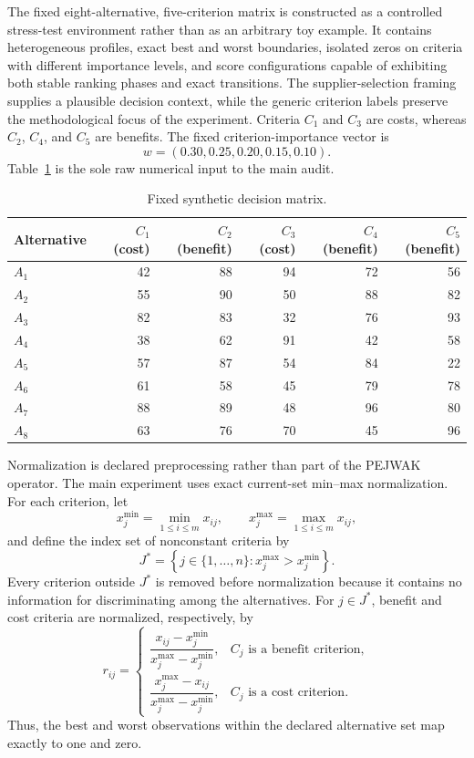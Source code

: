 \documentclass[reqno,11pt]{amsart}
\theoremstyle{definition}
\theoremstyle{plain}
\theoremstyle{remark}
\begin{document}
The fixed eight-alternative, five-criterion matrix is constructed as a
controlled stress-test environment rather than as an arbitrary toy
example. It contains heterogeneous profiles, exact best and worst
boundaries, isolated zeros on criteria with different importance levels,
and score configurations capable of exhibiting both stable ranking
phases and exact transitions. The supplier-selection framing supplies a
plausible decision context, while the generic criterion labels preserve
the methodological focus of the experiment. Criteria \(C_1\) and \(C_3\)
are costs, whereas \(C_2\), \(C_4\), and \(C_5\) are benefits. The fixed
criterion-importance vector is
\begin{equation*}
w=(0.30,0.25,0.20,0.15,0.10).
\end{equation*}
Table~\ref{tab:raw-matrix} is the sole raw numerical input to the main
audit.


\begin{table}[htbp]
\centering
\caption{Fixed synthetic decision matrix.}
\label{tab:raw-matrix}
\begin{tabular}{lrrrrr}
\toprule
Alternative
& $C_1$ (cost)
& $C_2$ (benefit)
& $C_3$ (cost)
& $C_4$ (benefit)
& $C_5$ (benefit)\\
\midrule
$A_1$&42&88&94&72&56\\
$A_2$&55&90&50&88&82\\
$A_3$&82&83&32&76&93\\
$A_4$&38&62&91&42&58\\
$A_5$&57&87&54&84&22\\
$A_6$&61&58&45&79&78\\
$A_7$&88&89&48&96&80\\
$A_8$&63&76&70&45&96\\
\bottomrule
\end{tabular}
\end{table}

\label{subsec:numerical-normalization}

Normalization is declared preprocessing rather than part of the PEJWAK operator. The main experiment uses exact current-set min--max normalization. For each criterion, let
\[
x_j^{\min}=\min_{1\leq i\leq m}x_{ij},
\qquad
x_j^{\max}=\max_{1\leq i\leq m}x_{ij},
\]
and define the index set of nonconstant criteria by
\[
J^\ast
=
\left\{
j\in\{1,\ldots,n\}:
x_j^{\max}>x_j^{\min}
\right\}.
\]
Every criterion outside $J^\ast$ is removed before normalization because
it contains no information for discriminating among the alternatives.
For $j\in J^\ast$, benefit and cost criteria are normalized,
respectively, by
\begin{equation}
r_{ij}=
\begin{cases}
\dfrac{x_{ij}-x_j^{\min}}
{x_j^{\max}-x_j^{\min}},
& C_j \text{ is a benefit criterion},\\[9pt]
\dfrac{x_j^{\max}-x_{ij}}
{x_j^{\max}-x_j^{\min}},
& C_j \text{ is a cost criterion}.
\end{cases}
\label{eq:minmax-normalization}
\end{equation}
Thus, the best and worst observations within the declared alternative
set map exactly to one and zero.
\end{document}
